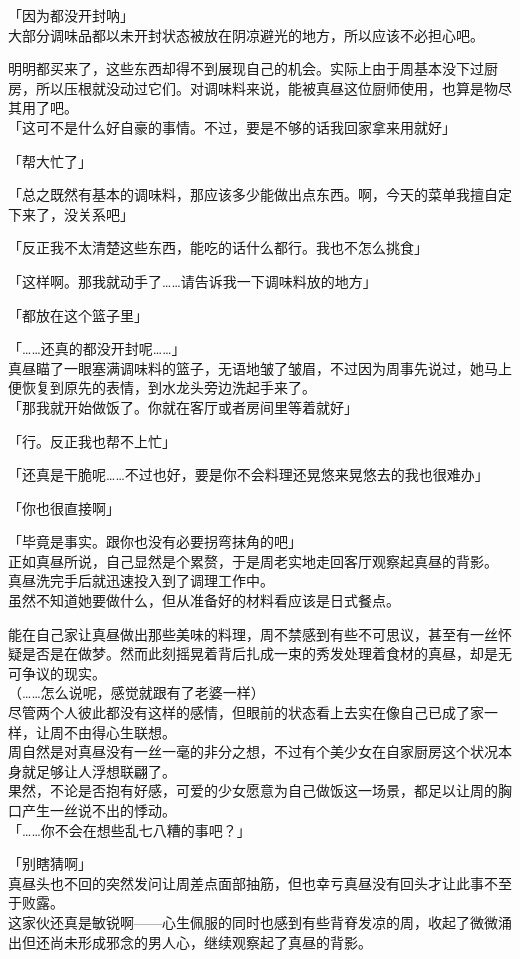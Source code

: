 「因为都没开封呐」\\

大部分调味品都以未开封状态被放在阴凉避光的地方，所以应该不必担心吧。

明明都买来了，这些东西却得不到展现自己的机会。实际上由于周基本没下过厨房，所以压根就没动过它们。对调味料来说，能被真昼这位厨师使用，也算是物尽其用了吧。\\

「这可不是什么好自豪的事情。不过，要是不够的话我回家拿来用就好」

「帮大忙了」

「总之既然有基本的调味料，那应该多少能做出点东西。啊，今天的菜单我擅自定下来了，没关系吧」

「反正我不太清楚这些东西，能吃的话什么都行。我也不怎么挑食」

「这样啊。那我就动手了……请告诉我一下调味料放的地方」

「都放在这个篮子里」

「……还真的都没开封呢……」\\

真昼瞄了一眼塞满调味料的篮子，无语地皱了皱眉，不过因为周事先说过，她马上便恢复到原先的表情，到水龙头旁边洗起手来了。\\

「那我就开始做饭了。你就在客厅或者房间里等着就好」

「行。反正我也帮不上忙」

「还真是干脆呢……不过也好，要是你不会料理还晃悠来晃悠去的我也很难办」

「你也很直接啊」

「毕竟是事实。跟你也没有必要拐弯抹角的吧」\\

正如真昼所说，自己显然是个累赘，于是周老实地走回客厅观察起真昼的背影。\\

真昼洗完手后就迅速投入到了调理工作中。\\

虽然不知道她要做什么，但从准备好的材料看应该是日式餐点。

能在自己家让真昼做出那些美味的料理，周不禁感到有些不可思议，甚至有一丝怀疑是否是在做梦。然而此刻摇晃着背后扎成一束的秀发处理着食材的真昼，却是无可争议的现实。\\

（……怎么说呢，感觉就跟有了老婆一样）\\

尽管两个人彼此都没有这样的感情，但眼前的状态看上去实在像自己已成了家一样，让周不由得心生联想。\\

周自然是对真昼没有一丝一毫的非分之想，不过有个美少女在自家厨房这个状况本身就足够让人浮想联翩了。\\

果然，不论是否抱有好感，可爱的少女愿意为自己做饭这一场景，都足以让周的胸口产生一丝说不出的悸动。\\

「……你不会在想些乱七八糟的事吧？」

「别瞎猜啊」\\

真昼头也不回的突然发问让周差点面部抽筋，但也幸亏真昼没有回头才让此事不至于败露。\\

这家伙还真是敏锐啊——心生佩服的同时也感到有些背脊发凉的周，收起了微微涌出但还尚未形成邪念的男人心，继续观察起了真昼的背影。

